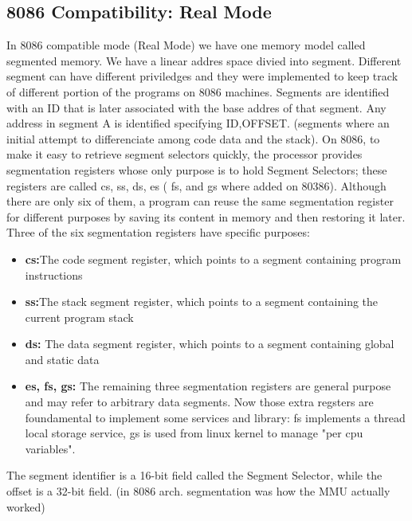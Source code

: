 \documentclass[a4paper,12pt]{article}
\begin{document}
\subsection{8086 Compatibility: Real Mode}
In 8086 compatible mode (Real Mode) we have one memory model called segmented memory. We have a linear addres space divied into segment. Different segment can have different priviledges and they were implemented to keep track of different portion of the programs on 8086 machines.
Segments are identified with an ID that is later associated with the base addres of that segment. Any address in segment A is identified specifying ID,OFFSET. (segments where an initial attempt to differenciate among code data and the stack). On 8086, to make it easy to retrieve segment selectors quickly, the processor provides segmentation registers whose only purpose is to hold Segment Selectors; these registers are called cs, ss, ds, es ( fs, and gs where added on 80386). Although there are only six of them, a program can reuse the same segmentation register for different purposes by saving its content in memory and then restoring it later. Three of the six segmentation registers have specific purposes:\begin{itemize}
\item \textbf{cs:}The code segment register, which points to a segment containing program instructions
\item \textbf{ss:}The stack segment register, which points to a segment containing the current program stack
\item \textbf{ds:} The data segment register, which points to a segment containing global and static data
\item \textbf{es, fs, gs:} The remaining three segmentation registers are general purpose and may refer to arbitrary data segments. Now those extra regsters are foundamental to implement some services and library: fs implements a thread local storage service, gs is used from linux kernel to manage "per cpu variables".
\end{itemize}
The segment identifier is a 16-bit field called the Segment Selector, while the offset is a 32-bit field.
(in 8086 arch. segmentation was how the MMU actually worked)
\end{document}
